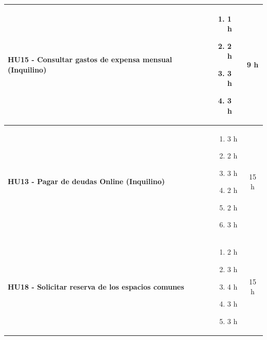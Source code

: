 \begin{longtable}{|p{10.5cm}|p{2.5cm}|c|}
    \\ \hline
        
            \textbf{HU15 - Consultar gastos de expensa mensual (Inquilino)} 
        
        &

            \begin{enumerate}[leftmargin=*,nosep]
                \item 1 h
                \item 2 h
                \item 3 h
                \item 3 h
            \end{enumerate} 
        
        &
            9 h
    
    \\ \hline
        
            \textbf{HU13 - Pagar de deudas Online (Inquilino)} 
        
        &

            \begin{enumerate}[leftmargin=*,nosep]
                \item 3 h
                \item 2 h
                \item 3 h
                \item 2 h
                \item 2 h
                \item 3 h
            \end{enumerate} 
        
        &
            15 h
    
    \\ \hline
        
            \textbf{HU18 - Solicitar reserva de los espacios comunes} 
        
        &

            \begin{enumerate}[leftmargin=*,nosep]
                \item 2 h
                \item 3 h
                \item 4 h
                \item 3 h
                \item 3 h
            \end{enumerate} 
        
        &
            15 h
    

\end{longtable}
